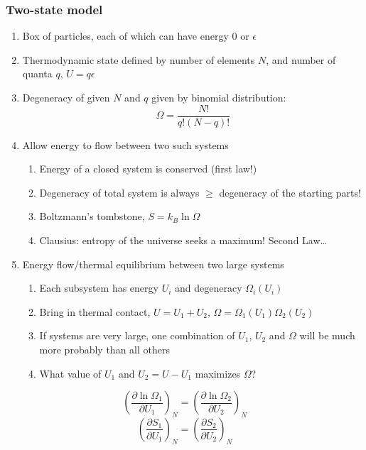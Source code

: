\documentclass[11pt]{article}
\begin{document}
\subsubsection{Two-state model}
\label{sec:orgfc8bc16}
\begin{enumerate}
\item Box of particles, each of which can have energy 0 or \(\epsilon\)
\item Thermodynamic state defined by number of elements \(N\), and number of
quanta \(q\), \(U=q\epsilon\)
\item Degeneracy of given \(N\) and \(q\) given by binomial distribution:
\begin{displaymath}
  \Omega=\frac{N!}{q!(N-q)!}
\end{displaymath}
\item Allow energy to flow between two such systems
\begin{enumerate}
\item Energy of a closed system is conserved (first law!)
\item Degeneracy of total system is always \(\geq\) degeneracy of the
starting parts!
\item Boltzmann's tombstone, \(S = k_B \ln \Omega\)
\item Clausius: entropy of the universe seeks a maximum!  Second Law\ldots{}
\end{enumerate}
\item Energy flow/thermal equilibrium between two large systems
\begin{enumerate}
\item Each subsystem has energy \(U_i\) and degeneracy \(\Omega_i(U_i)\)
\item Bring in thermal contact, \(U=U_1+U_2\), \(\Omega=\Omega_1(U_1)\Omega_2(U_2)\)
\item If systems are very large, one combination of \(U_1\), \(U_2\) and \(\Omega\)
will be much more probably than all others
\item What value of \(U_1\) and \(U_2=U-U_1\) maximizes \(\Omega\)?
\end{enumerate}
\end{enumerate}
\begin{displaymath}
 \left ( \frac{\partial \ln \Omega_1}{\partial U_1} \right )_N = \left ( \frac{\partial \ln \Omega_2}{\partial U_2} \right )_N
\end{displaymath}
\begin{displaymath}
 \left ( \frac{\partial S_1}{\partial U_1} \right )_N = \left ( \frac{\partial S_2}{\partial U_2} \right )_N
\end{displaymath}
\end{document}

